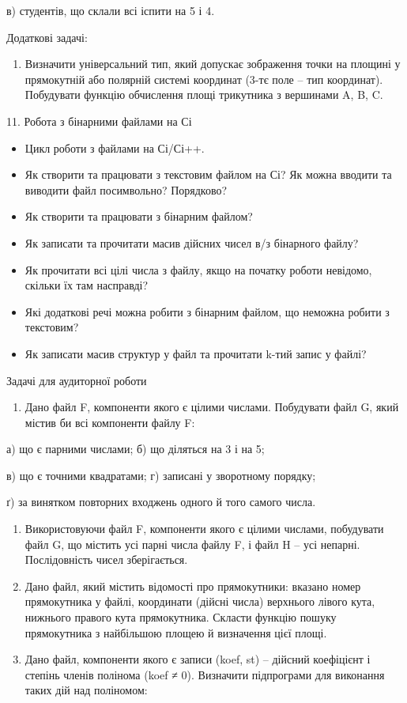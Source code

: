 \documentclass[]{article}
\begin{document}
в) студентів, що склали всі іспити на 5 і 4.

Додаткові задачі:

\begin{enumerate}
\def\labelenumi{\arabic{enumi})}
\setcounter{enumi}{6}
\item
  Визначити універсальний тип, який допускає зображення точки на площині
  у прямокутній або полярній системі координат (3-тє поле -- тип
  координат). Побудувати функцію обчислення площі трикутника з вершинами
  A, B, C.
\end{enumerate}

11. Робота з бінарними файлами на Сі

\begin{itemize}
\item
  Цикл роботи з файлами на Сі/Сі++.
\item
  Як створити та працювати з текстовим файлом на Сі? Як можна вводити та
  виводити файл посимвольно? Порядково?
\item
  Як створити та працювати з бінарним файлом?
\item
  Як записати та прочитати масив дійсних чисел в/з бінарного файлу?
\item
  Як прочитати всі цілі числа з файлу, якщо на початку роботи невідомо,
  скільки їх там насправді?
\item
  Які додаткові речі можна робити з бінарним файлом, що неможна робити з
  текстовим?
\item
  Як записати масив структур у файл та прочитати k-тий запис у файлі?
\end{itemize}

Задачі для аудиторної роботи

\begin{enumerate}
\def\labelenumi{\arabic{enumi})}
\item
  Дано файл F, компоненти якого є цілими числами. Побудувати файл G,
  який містив би всі компоненти файлу F:
\end{enumerate}

а) що є парними числами; б) що діляться на 3 і на 5;

в) що є точними квадратами; г) записані у зворотному порядку;

ґ) за винятком повторних входжень одного й того самого числа.

\begin{enumerate}
\def\labelenumi{\arabic{enumi})}
\item
  Використовуючи файл F, компоненти якого є цілими числами, побудувати
  файл G, що містить усі парні числа файлу F, і файл H -- усі непарні.
  Послідовність чисел зберігається.
\item
  Дано файл, який містить відомості про прямокутники: вказано номер
  прямокутника у файлі, координати (дійсні числа) верхнього лівого кута,
  нижнього правого кута прямокутника. Скласти функцію пошуку
  прямокутника з найбільшою площею й визначення цієї площі.
\item
  Дано файл, компоненти якого є записи (koef, st) -- дійсний коефіцієнт
  і степінь членів полінома (koef ≠ 0). Визначити підпрограми для
  виконання таких дій над поліномом:
\end{enumerate}
\end{document}
